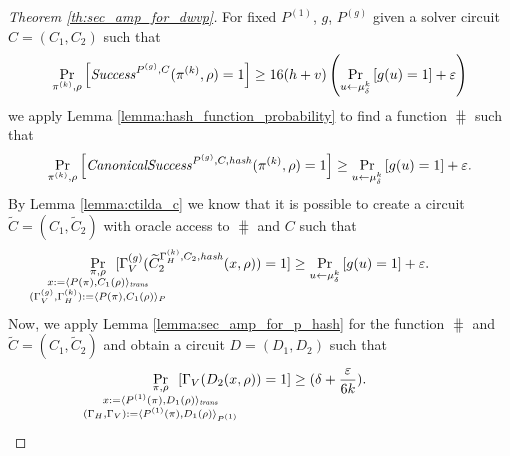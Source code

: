 \begin{proof}[Theorem \ref{th:sec_amp_for_dwvp}]
%
For fixed $P^{(1)}$, $g$, $P^{(g)}$ given a solver circuit $C = (C_1, C_2)$ such that
\begin{align*}
    \underset{\pi^{(k)}, \rho}{\Pr}\left[\operatorname{\mathit{Success}}^{P^{(g)}, C}(\pi^{(k)}, \rho) = 1\right] \geq 16(h+v)\left(\underset{u \leftarrow \mu_\delta^k}{\Pr}\left[g(u) = 1\right] + \varepsilon\right)
\end{align*}
we apply Lemma \ref{lemma:hash_function_probability} to find a function $\hash$ such that
\begin{align*}
    \underset{\pi^{(k)}, \rho}{\Pr}\left[\operatorname{\mathit{CanonicalSuccess}}^{P^{(g)}, C, \operatorname{\mathit{hash}}}(\pi^{(k)}, \rho) = 1\right] \geq \underset{u \leftarrow \mu_\delta^k}{\Pr}\left[g(u) = 1\right] + \varepsilon.
\end{align*}
By Lemma \ref{lemma:ctilda_c} we know that it is possible to create a circuit $\widetilde{C} = (C_1, \widetilde{C}_2)$ with oracle access to $\hash$ and $C$ such that
\begin{align*}
    \underset{
      \mathclap {
      \substack{\pi, \rho \\
        x := \langle P(\pi), C_1(\rho) \rangle_{\mathit{trans}} \\
        (\Gamma_V^{(g)}, \Gamma_H^{(k)}) := \langle P(\pi), C_1(\rho) \rangle_{P}
      }}}
    {\Pr}\mkern13mu[\Gamma_V^{(g)}(\widetilde{C}_2^{\Gamma_H^{(k)}, C_2, \hash}(x, \rho)) = 1]
    \geq
\underset{u \leftarrow \mu_\delta^k}{\Pr}\left[g(u) = 1\right] + \varepsilon.
\end{align*}
Now, we apply Lemma \ref{lemma:sec_amp_for_p_hash} for the function $\hash$ and $\widetilde{C} = (C_1, \widetilde{C}_2)$ and obtain a circuit $D = (D_1, D_2)$ such that
\begin{align}
  \label{eq:succ_prob_d}
    \underset{
      \mathclap{
      \substack{\pi, \rho \\ x := \langle P^{(1)}(\pi), D_1(\rho) \rangle_{\mathit{trans}} \\
        (\Gamma_H, \Gamma_V) := \langle P^{(1)}(\pi), D_1(\rho) \rangle_{P^{(1)}}}}}
    {\Pr}\mkern13mu[\Gamma_V(D_2(x, \rho)) = 1] \geq (\delta + \frac{\varepsilon}{6k}).
\end{align}
%
\end{proof}

